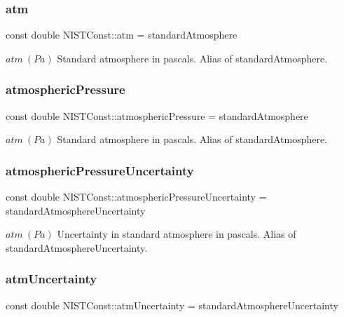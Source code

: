 \subsubsection{\texorpdfstring{atm}{atm}}
{\footnotesize\ttfamily const double N\+I\+S\+T\+Const\+::atm = standard\+Atmosphere}

$atm \ (Pa)$ Standard atmosphere in pascals. Alias of standard\+Atmosphere. \mbox{\label{group___standard_atmosphere_gab92a3a9d0d82fc926390602e825afea5}} 
\subsubsection{\texorpdfstring{atmospheric\+Pressure}{atmosphericPressure}}
{\footnotesize\ttfamily const double N\+I\+S\+T\+Const\+::atmospheric\+Pressure = standard\+Atmosphere}

$atm \ (Pa)$ Standard atmosphere in pascals. Alias of standard\+Atmosphere. \mbox{\label{group___standard_atmosphere_gab6ab2c05e40b36d9e6284e8ebaceed37}} 
\subsubsection{\texorpdfstring{atmospheric\+Pressure\+Uncertainty}{atmosphericPressureUncertainty}}
{\footnotesize\ttfamily const double N\+I\+S\+T\+Const\+::atmospheric\+Pressure\+Uncertainty = standard\+Atmosphere\+Uncertainty}

$atm \ (Pa)$ Uncertainty in standard atmosphere in pascals. Alias of standard\+Atmosphere\+Uncertainty. \mbox{\label{group___standard_atmosphere_gace6ef7e45b2b26b9f48c8495d8a349d0}} 
\subsubsection{\texorpdfstring{atm\+Uncertainty}{atmUncertainty}}
{\footnotesize\ttfamily const double N\+I\+S\+T\+Const\+::atm\+Uncertainty = standard\+Atmosphere\+Uncertainty}

